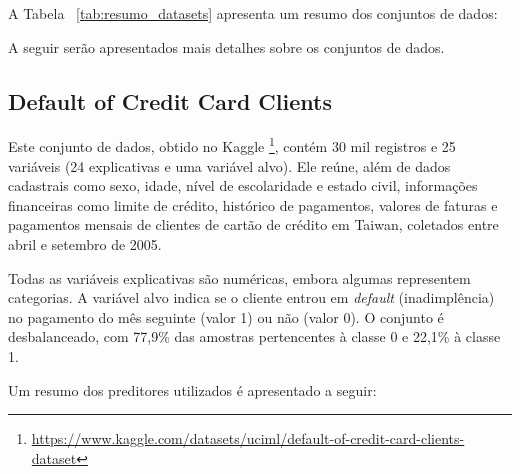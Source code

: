 A Tabela ~\ref{tab:resumo_datasets} apresenta um resumo dos conjuntos de dados:


\begin{table}[H]
	\centering
	\caption{Resumo dos datasets utilizados no experimento}
	\label{tab:resumo_datasets}
\end{table}


A seguir serão apresentados mais detalhes sobre os conjuntos de dados.

\subsection{Default of Credit Card Clients}

Este conjunto de dados, obtido no Kaggle \footnote{\url{https://www.kaggle.com/datasets/uciml/default-of-credit-card-clients-dataset}}, contém 30 mil registros e 25 variáveis (24 explicativas e uma variável alvo). Ele reúne, além de dados cadastrais como sexo, idade, nível de escolaridade e estado civil, informações financeiras como limite de crédito, histórico de pagamentos, valores de faturas e pagamentos mensais de clientes de cartão de crédito em Taiwan, coletados entre abril e setembro de 2005.

Todas as variáveis explicativas são numéricas, embora algumas representem categorias. A variável alvo indica se o cliente entrou em \textit{default} (inadimplência) no pagamento do mês seguinte (valor 1) ou não (valor 0). O conjunto é desbalanceado, com 77,9\% das amostras pertencentes à classe 0 e 22,1\% à classe 1.

Um resumo dos preditores utilizados é apresentado a seguir:

